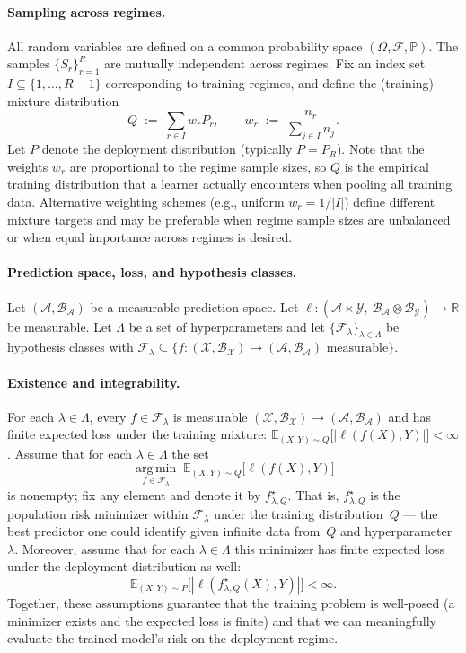 \documentclass[11pt]{article}
\newcommand{\E}{\mathbb{E}}
\newcommand{\R}{\mathbb{R}}
\newcommand{\cF}{\mathcal{F}}
\newcommand{\argmin}{\operatorname*{arg\,min}}
\begin{document}
\paragraph{Sampling across regimes.}
All random variables are defined on a common probability space $(\Omega,\mathcal F,\mathbb P)$.
The samples $\{S_r\}_{r=1}^R$ are mutually independent across regimes.
Fix an index set $I\subseteq\{1,\dots,R-1\}$ corresponding to training regimes, and define the
(training) mixture distribution
\[
Q \;:=\; \sum_{r\in I} w_r P_r,
\qquad
w_r \;:=\; \frac{n_r}{\sum_{j\in I} n_j}.
\]
Let $P$ denote the deployment distribution (typically $P=P_R$).
Note that the weights $w_r$ are proportional to the regime sample sizes, so $Q$ is the empirical
training distribution that a learner actually encounters when pooling all training data. Alternative
weighting schemes (e.g., uniform $w_r=1/|I|$) define different mixture targets and may be preferable
when regime sample sizes are unbalanced or when equal importance across regimes is desired.

\paragraph{Prediction space, loss, and hypothesis classes.}
Let $(\mathcal A,\mathcal B_{\mathcal A})$ be a measurable prediction space.
Let $\ell:(\mathcal A\times\mathcal Y,\ \mathcal B_{\mathcal A}\otimes\mathcal B_{\mathcal Y})\to\R$ be measurable.
Let $\Lambda$ be a set of hyperparameters and let $\{\cF_\lambda\}_{\lambda\in\Lambda}$ be hypothesis classes with
$\cF_\lambda \subseteq \{f:(\mathcal X,\mathcal B_{\mathcal X})\to(\mathcal A,\mathcal B_{\mathcal A})\text{ measurable}\}$.


\paragraph{Existence and integrability.}
For each $\lambda\in\Lambda$, every $f\in\cF_\lambda$ is measurable $(\mathcal X,\mathcal B_{\mathcal X})\to(\mathcal A,\mathcal B_{\mathcal A})$
and has finite expected loss under the training mixture:
$\E_{(X,Y)\sim Q}\!\big[|\ell(f(X),Y)|\big]<\infty$.
Assume that for each $\lambda\in\Lambda$ the set
\[
\argmin_{f\in\cF_\lambda}\; \E_{(X,Y)\sim Q}\big[\ell(f(X),Y)\big]
\]
is nonempty; fix any element and denote it by $f^\star_{\lambda,Q}$.
That is, $f^\star_{\lambda,Q}$ is the population risk minimizer within
$\cF_\lambda$ under the training distribution~$Q$ --- the best predictor one
could identify given infinite data from~$Q$ and hyperparameter~$\lambda$.
Moreover, assume that for each $\lambda\in\Lambda$ this minimizer has finite
expected loss under the deployment distribution as well:
\[
\E_{(X,Y)\sim P}\!\big[|\ell(f^\star_{\lambda,Q}(X),Y)|\big]<\infty.
\]
Together, these assumptions guarantee that the training problem is well-posed
(a minimizer exists and the expected loss is finite) and that we can
meaningfully evaluate the trained model's risk on the deployment regime.
\end{document}
